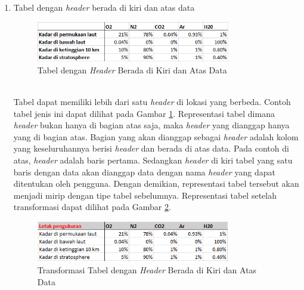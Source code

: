 \begin{enumerate}
	\item Tabel dengan \textit{header} berada di kiri dan atas data
	\begin{figure}[htbp]
	    \centering
	    \includegraphics[width=0.8\textwidth]{resources/chapter-3-tabletype-2.png}
	    \caption{Tabel dengan \textit{Header} Berada di Kiri dan Atas Data}
		\label{TabelTipe2}
	\end{figure}\\
	Tabel dapat memiliki lebih dari satu \textit{header} di lokasi yang berbeda. Contoh tabel jenis ini dapat dilihat pada Gambar \ref{TabelTipe2}. Representasi tabel dimana \textit{header} bukan hanya di bagian atas saja, maka \textit{header} yang dianggap hanya yang di bagian atas. Bagian yang akan dianggap sebagai \textit{header} adalah kolom yang keseluruhannya berisi \textit{header} dan berada di atas data. Pada contoh di atas, \textit{header} adalah baris pertama. Sedangkan \textit{header} di kiri tabel yang satu baris dengan data akan dianggap data dengan nama \textit{header} yang dapat ditentukan oleh pengguna. Dengan demikian, representasi tabel tersebut akan menjadi mirip dengan tipe tabel sebelumnya. Representasi tabel setelah transformasi dapat dilihat pada Gambar \ref{TabelTipe2T}.\\
	\begin{figure}[htbp]
	    \centering
	    \includegraphics[width=0.8\textwidth]{resources/chapter-3-tabletype-2-transformed.png}
	    \caption{Transformasi Tabel dengan \textit{Header} Berada di Kiri dan Atas Data}
		\label{TabelTipe2T}
	\end{figure}


\end{enumerate}
